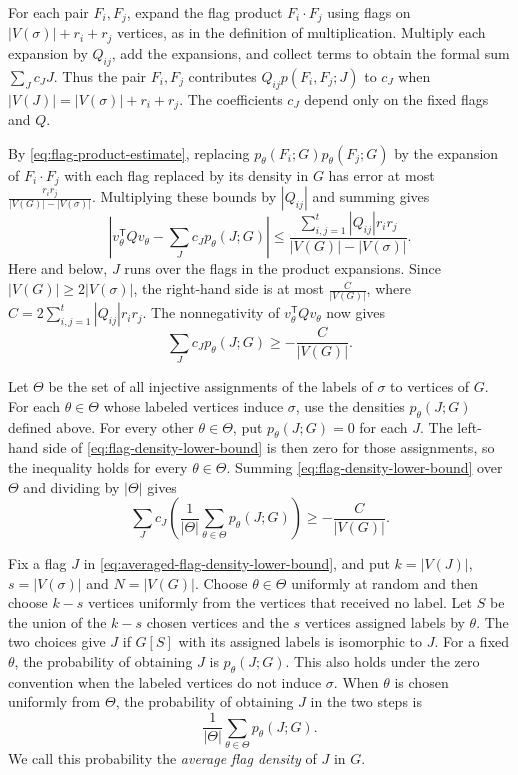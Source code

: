 \documentclass[preprint,11pt,numbers]{elsarticle-arxiv}
\numberwithin{equation}{section}
\theoremstyle{definition}
\begin{document}
For each pair $F_i,F_j$, expand the flag product $F_i\cdot F_j$
using flags on $|V(\sigma)|+r_i+r_j$ vertices, as in the definition
of multiplication. Multiply each expansion by $Q_{ij}$, add the
expansions, and collect terms to obtain the formal sum
$\sum_J c_JJ$. Thus the pair $F_i,F_j$ contributes
$Q_{ij}p(F_i,F_j;J)$ to $c_J$ when
$|V(J)|=|V(\sigma)|+r_i+r_j$. The coefficients $c_J$ depend only
on the fixed flags and $Q$.

By \eqref{eq:flag-product-estimate}, replacing
$p_\theta(F_i;G)p_\theta(F_j;G)$ by the expansion of
$F_i\cdot F_j$ with each flag replaced by its density in $G$
has error at most $\frac{r_ir_j}{|V(G)|-|V(\sigma)|}$.
Multiplying these bounds by $|Q_{ij}|$ and summing gives
\[
  \left|v_\theta^{\mathsf T}Qv_\theta
       -\sum_J c_Jp_\theta(J;G)\right|
  \leq
  \frac{\sum_{i,j=1}^{t}|Q_{ij}|r_ir_j}
       {|V(G)|-|V(\sigma)|}.
\]
Here and below, $J$ runs over the flags in the product
expansions. Since $|V(G)|\geq 2|V(\sigma)|$, the right-hand
side is at most $\frac{C}{|V(G)|}$, where
$C=2\sum_{i,j=1}^{t}|Q_{ij}|r_ir_j$. The nonnegativity of
$v_\theta^{\mathsf T}Qv_\theta$ now gives
\begin{equation}\label{eq:flag-density-lower-bound}
  \sum_J c_Jp_\theta(J;G)\geq-\frac{C}{|V(G)|}.
\end{equation}

Let $\Theta$ be the set of all injective assignments of the
labels of $\sigma$ to vertices of $G$. For each $\theta\in\Theta$
whose labeled vertices induce $\sigma$, use the densities
$p_\theta(J;G)$ defined above. For every other $\theta\in\Theta$,
put $p_\theta(J;G)=0$ for each $J$. The left-hand side of
\eqref{eq:flag-density-lower-bound} is then zero for those
assignments, so the inequality holds for every $\theta\in\Theta$.
Summing \eqref{eq:flag-density-lower-bound} over $\Theta$ and
dividing by $|\Theta|$ gives
\begin{equation}\label{eq:averaged-flag-density-lower-bound}
  \sum_J c_J
    \left(\frac{1}{|\Theta|}\sum_{\theta\in\Theta}p_\theta(J;G)\right)
  \geq -\frac{C}{|V(G)|}.
\end{equation}

Fix a flag $J$ in \eqref{eq:averaged-flag-density-lower-bound}, and
put $k=|V(J)|$, $s=|V(\sigma)|$ and $N=|V(G)|$. Choose
$\theta\in\Theta$ uniformly at random and then choose $k-s$ vertices
uniformly from the vertices that received no label. Let $S$ be
the union of the $k-s$ chosen vertices and the $s$ vertices
assigned labels by $\theta$. The two choices give $J$ if $G[S]$ with its assigned labels is
isomorphic to $J$. For a fixed $\theta$, the probability of
obtaining $J$ is $p_\theta(J;G)$. This also holds
under the zero convention when the labeled vertices do not
induce $\sigma$. When $\theta$ is chosen uniformly from $\Theta$,
the probability of obtaining $J$ in the two steps is
\[
  \frac{1}{|\Theta|}\sum_{\theta\in\Theta}p_\theta(J;G).
\]
We call this probability the \emph{average flag density} of $J$
in $G$.
\end{document}
